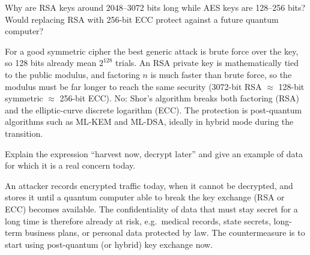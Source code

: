 \begin{exercise}
Why are RSA keys around 2048--3072 bits long while AES keys are 128--256 bits? Would replacing RSA with 256-bit ECC protect against a future quantum computer?
\end{exercise}
\begin{solution}
For a good symmetric cipher the best generic attack is brute force over the key, so 128 bits already mean $2^{128}$ trials. An RSA private key is mathematically tied to the public modulus, and factoring $n$ is much faster than brute force, so the modulus must be far longer to reach the same security (3072-bit RSA $\approx$ 128-bit symmetric $\approx$ 256-bit ECC). No: Shor's algorithm breaks both factoring (RSA) and the elliptic-curve discrete logarithm (ECC). The protection is post-quantum algorithms such as ML-KEM and ML-DSA, ideally in hybrid mode during the transition.
\end{solution}

\begin{exercise}
Explain the expression \enquote{harvest now, decrypt later} and give an example of data for which it is a real concern today.
\end{exercise}
\begin{solution}
An attacker records encrypted traffic today, when it cannot be decrypted, and stores it until a quantum computer able to break the key exchange (RSA or ECC) becomes available. The confidentiality of data that must stay secret for a long time is therefore already at risk, e.g.\ medical records, state secrets, long-term business plans, or personal data protected by law. The countermeasure is to start using post-quantum (or hybrid) key exchange now.
\end{solution}
